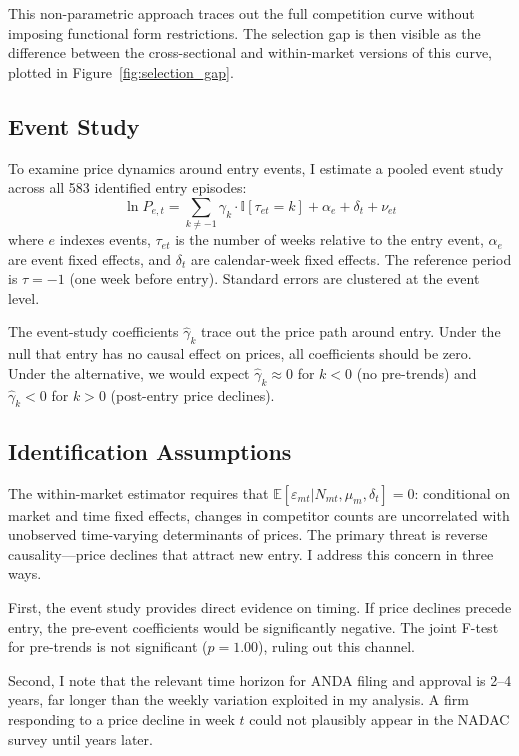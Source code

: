\documentclass[12pt]{article}
\newcommand{\E}{\mathbb{E}}
\newcommand{\ind}{\mathbb{I}}
\begin{document}
This non-parametric approach traces out the full competition curve without imposing functional form restrictions. The selection gap is then visible as the difference between the cross-sectional and within-market versions of this curve, plotted in Figure~\ref{fig:selection_gap}.

\subsection{Event Study}

To examine price dynamics around entry events, I estimate a pooled event study across all 583 identified entry episodes:
\begin{equation}\label{eq:event}
\ln P_{e,t} = \sum_{k \neq -1} \gamma_k \cdot \ind[\tau_{et} = k] + \alpha_e + \delta_t + \nu_{et}
\end{equation}
where $e$ indexes events, $\tau_{et}$ is the number of weeks relative to the entry event, $\alpha_e$ are event fixed effects, and $\delta_t$ are calendar-week fixed effects. The reference period is $\tau = -1$ (one week before entry). Standard errors are clustered at the event level.

The event-study coefficients $\hat{\gamma}_k$ trace out the price path around entry. Under the null that entry has no causal effect on prices, all coefficients should be zero. Under the alternative, we would expect $\hat{\gamma}_k \approx 0$ for $k < 0$ (no pre-trends) and $\hat{\gamma}_k < 0$ for $k > 0$ (post-entry price declines).

\subsection{Identification Assumptions}

The within-market estimator requires that $\E[\varepsilon_{mt} | N_{mt}, \mu_m, \delta_t] = 0$: conditional on market and time fixed effects, changes in competitor counts are uncorrelated with unobserved time-varying determinants of prices. The primary threat is reverse causality---price declines that attract new entry. I address this concern in three ways.

First, the event study provides direct evidence on timing. If price declines precede entry, the pre-event coefficients would be significantly negative. The joint F-test for pre-trends is not significant ($p = 1.00$), ruling out this channel.

Second, I note that the relevant time horizon for ANDA filing and approval is 2--4 years, far longer than the weekly variation exploited in my analysis. A firm responding to a price decline in week $t$ could not plausibly appear in the NADAC survey until years later.
\end{document}
